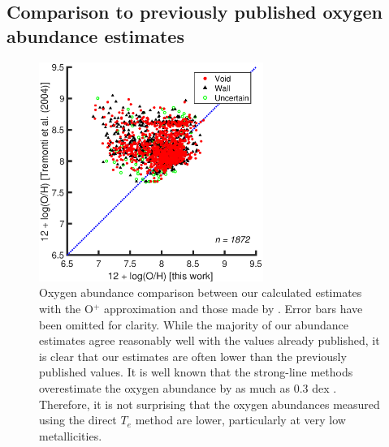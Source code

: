 \subsection{Comparison to previously published oxygen abundance estimates}

\begin{figure}
    \centering
    \includegraphics[width=0.65\textwidth]{Images/Paper3/1sig_dwarf_I06relations_SF_t3_T04comparison_dust}
    \caption[Comparison of O$^+$ approximation metallicities to 
    \cite{Tremonti04}]{Oxygen abundance comparison between our calculated 
    estimates with the O$^+$ approximation and those made by \cite{Tremonti04}.  
    Error bars have been omitted for clarity.  While the majority of our 
    abundance estimates agree reasonably well with the values already published, 
    it is clear that our estimates are often lower than the previously published 
    values.  It is well known that the strong-line methods \citep[like those 
    used by][]{Tremonti04} overestimate the oxygen abundance by as much as 0.3 
    dex \citep{Kennicutt03}.  Therefore, it is not surprising that the oxygen 
    abundances measured using the direct $T_e$ method are lower, particularly at 
    very low metallicities.}
    \label{fig:T04_comp}
\end{figure}

